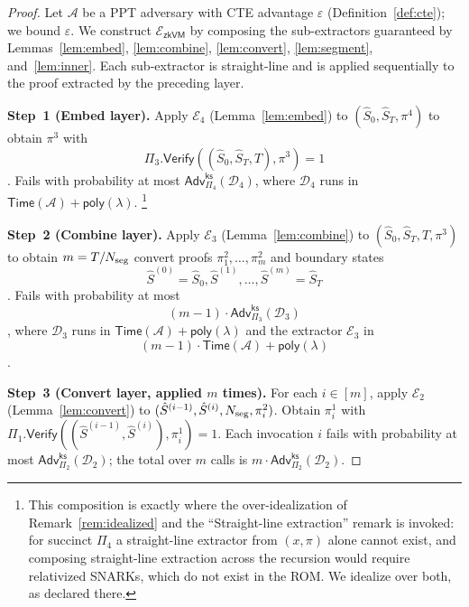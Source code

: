 \begin{proof}
Let $\mathcal{A}$ be a PPT adversary with CTE advantage $\varepsilon$
(Definition~\ref{def:cte}); we bound $\varepsilon$.
We construct $\mathcal{E}_{\mathsf{zkVM}}$ by composing the sub-extractors
guaranteed by Lemmas~\ref{lem:embed}, \ref{lem:combine}, \ref{lem:convert},
\ref{lem:segment}, and~\ref{lem:inner}.  Each sub-extractor
is straight-line and is applied sequentially to the proof extracted by the
preceding layer.

\textbf{Step~1 (Embed layer).}
Apply $\mathcal{E}_4$ (Lemma~\ref{lem:embed}) to $(\hat{S}_0,\hat{S}_T,\pi^4)$
to obtain $\pi^3$ with
\[
  \Pi_3.\mathsf{Verify}((\hat{S}_0,\hat{S}_T,T),\pi^3)=1
\]
.
Fails with probability at most $\mathsf{Adv}^{\mathsf{ks}}_{\Pi_4}(\mathcal{D}_4)$,
where $\mathcal{D}_4$ runs in $\mathsf{Time}(\mathcal{A})+\mathsf{poly}(\lambda)$.%
\footnote{This composition is exactly where the over-idealization of
Remark~\ref{rem:idealized} and the ``Straight-line extraction'' remark is
invoked: for succinct $\Pi_4$ a straight-line extractor from $(x,\pi)$ alone
cannot exist, and composing straight-line extraction across the recursion would
require relativized SNARKs, which do not exist in the ROM. We idealize over
both, as declared there.}

\textbf{Step~2 (Combine layer).}
Apply $\mathcal{E}_3$ (Lemma~\ref{lem:combine}) to $(\hat{S}_0,\hat{S}_T,T,\pi^3)$
to obtain $m=T/N_{\mathrm{seg}}$ convert proofs $\pi^2_1,\ldots,\pi^2_m$ and boundary
states
\[
  \hat{S}^{(0)}=\hat{S}_0,\hat{S}^{(1)},\ldots,\hat{S}^{(m)}=\hat{S}_T
\]
.
Fails with probability at most
\[
  (m-1)\cdot\mathsf{Adv}^{\mathsf{ks}}_{\Pi_3}(\mathcal{D}_3)
\]
,
where $\mathcal{D}_3$ runs in
$\mathsf{Time}(\mathcal{A})+\mathsf{poly}(\lambda)$ and the extractor $\mathcal{E}_3$
in
\[
  (m-1)\cdot\mathsf{Time}(\mathcal{A})+\mathsf{poly}(\lambda)
\]
.

\textbf{Step~3 (Convert layer, applied $m$ times).}
For each $i\in[m]$, apply $\mathcal{E}_2$ (Lemma~\ref{lem:convert})
to $(\hat{S}^{(i-1)},\hat{S}^{(i)},N_{\mathrm{seg}},\pi^2_i)$.
Obtain $\pi^1_i$ with $\Pi_1.\mathsf{Verify}((\hat{S}^{(i-1)},\hat{S}^{(i)}),\pi^1_i)=1$.
Each invocation $i$ fails with probability at most
$\mathsf{Adv}^{\mathsf{ks}}_{\Pi_2}(\mathcal{D}_2)$; the total over $m$ calls is
$m\cdot\mathsf{Adv}^{\mathsf{ks}}_{\Pi_2}(\mathcal{D}_2)$.


\end{proof}
